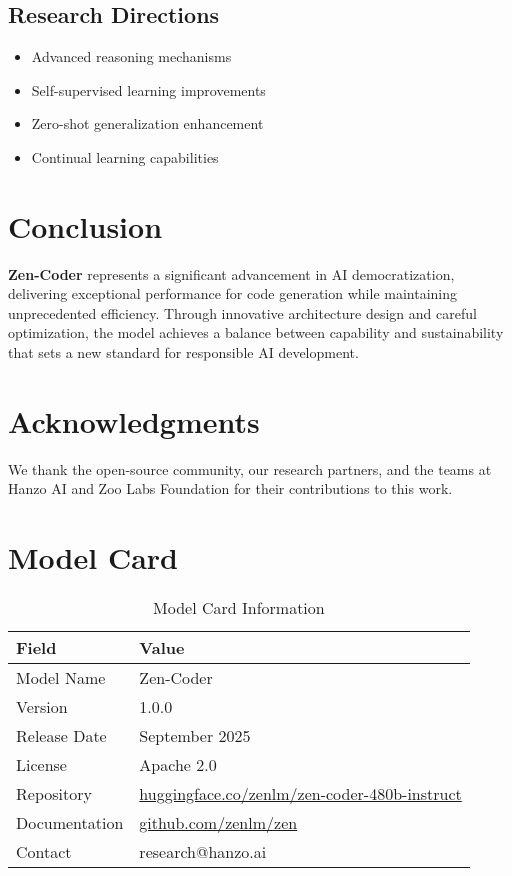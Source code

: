 \documentclass[11pt,a4paper]{article}
\begin{document}
\subsection{Research Directions}
\begin{itemize}
    \item Advanced reasoning mechanisms
    \item Self-supervised learning improvements
    \item Zero-shot generalization enhancement
    \item Continual learning capabilities
\end{itemize}

\section{Conclusion}

\textbf{Zen-Coder} represents a significant advancement in AI democratization, 
delivering exceptional performance for code generation while maintaining 
unprecedented efficiency. Through innovative architecture design and careful optimization, 
the model achieves a balance between capability and sustainability that sets a new standard 
for responsible AI development.

\section*{Acknowledgments}

We thank the open-source community, our research partners, and the teams at Hanzo AI and 
Zoo Labs Foundation for their contributions to this work.




\appendix

\section{Model Card}

\begin{table}[H]
\centering
\begin{tabular}{ll}
\toprule
\textbf{Field} & \textbf{Value} \\
\midrule
Model Name & Zen-Coder \\
Version & 1.0.0 \\
Release Date & September 2025 \\
License & Apache 2.0 \\
Repository & \href{https://huggingface.co/zenlm/zen-coder-480b-instruct}{huggingface.co/zenlm/zen-coder-480b-instruct} \\
Documentation & \href{https://github.com/zenlm/zen}{github.com/zenlm/zen} \\
Contact & research@hanzo.ai \\
\bottomrule
\end{tabular}
\caption{Model Card Information}
\end{table}
\end{document}
